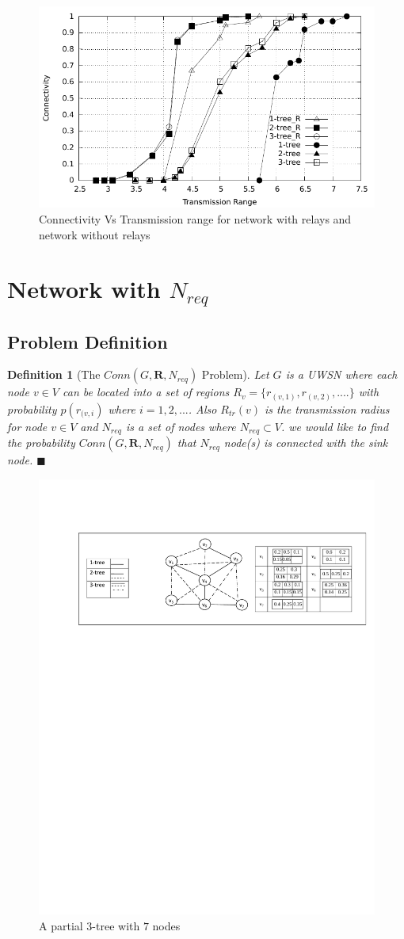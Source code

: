 \documentclass[12pt]{article}
\newtheorem*{defi}{Definition}
\begin{document}
\begin{figure}
\begin{minipage}{.9\linewidth}
\end{minipage}
\includegraphics[width=6 in, height=2.6 in]{NetworkI_woR.pdf}
\caption{Connectivity Vs Transmission range for network with relays and network without relays}
\label{Fig:NWOR}
\end{figure}

\section{Network with $N_{req}$}
\subsection{Problem Definition}
\begin{defi}[The $Conn(G,\textbf{R},N_{req})$ Problem]
\normalfont
Let $G$ is a UWSN where each node $v\in V$ can be located into a set of regions  $R_v=\{r_{(v,1)},r_{(v,2)},....\}$  with probability $p(r_{(v,i})$ where $i=1,2,...$. Also $R_{tr}(v)$ is the transmission radius for node $v\in V$ and $N_{req}$ is a set of nodes where $N_{req}\subset V$. we would like to find the probability $Conn(G,\textbf{R},N_{req})$ that $N_{req}$ node(s) is connected with the sink node. $\blacksquare$
\end{defi}

\begin{figure}
\centering
\begin{minipage}{.9\linewidth}
\end{minipage}
\includegraphics[width=5.5 in, height=1.8 in]{NReq.pdf}
\caption{A partial $3$-tree with $7$ nodes}
\label{Fig:Nreq}
\end{figure}
\end{document}
